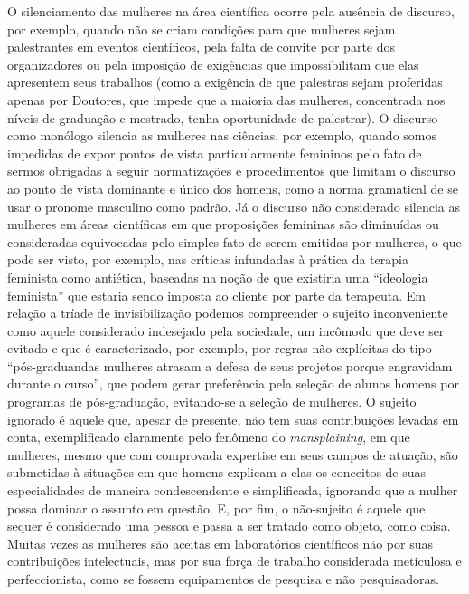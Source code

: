 O silenciamento das mulheres na área científica ocorre pela ausência de discurso, por exemplo, quando não se criam condições para que mulheres sejam palestrantes em eventos científicos, pela falta de convite por parte dos organizadores ou pela imposição de exigências que impossibilitam que elas apresentem seus trabalhos (como a exigência de que palestras sejam proferidas apenas por Doutores, que impede que a maioria das mulheres, concentrada nos níveis de graduação e mestrado, tenha oportunidade de palestrar). O discurso como monólogo silencia as mulheres nas ciências, por exemplo, quando somos impedidas de expor pontos de vista particularmente femininos pelo fato de sermos obrigadas a seguir normatizações e procedimentos que limitam o discurso ao ponto de vista dominante e único dos homens, como a norma gramatical de se usar o pronome masculino como padrão.  Já o discurso não considerado silencia as mulheres em áreas científicas em que proposições femininas são diminuídas ou consideradas equivocadas pelo simples fato de serem emitidas por mulheres, o que pode ser visto, por exemplo, nas críticas infundadas à prática da terapia feminista como antiética, baseadas na noção de que existiria uma “ideologia feminista” que estaria sendo imposta ao cliente por parte da terapeuta. Em relação a tríade de invisibilização podemos compreender o sujeito inconveniente como aquele considerado indesejado pela sociedade, um incômodo que deve ser evitado e que é caracterizado, por exemplo, por regras não explícitas do tipo “pós-graduandas mulheres atrasam a defesa de seus projetos porque engravidam durante o curso”, que podem gerar preferência pela seleção de alunos homens por programas de pós-graduação, evitando-se a seleção de mulheres. O sujeito ignorado é aquele que, apesar de presente, não tem suas contribuições levadas em conta, exemplificado claramente pelo fenômeno do \textit{mansplaining}, em que mulheres, mesmo que com comprovada expertise em seus campos de atuação, são submetidas à situações em que homens explicam a elas os conceitos de suas especialidades de maneira condescendente e simplificada, ignorando que a mulher possa dominar o assunto em questão. E, por fim, o não-sujeito é aquele que sequer é considerado uma pessoa e passa a ser tratado como objeto, como coisa. Muitas vezes as mulheres são aceitas em laboratórios científicos não por suas contribuições intelectuais, mas por sua força de trabalho considerada meticulosa e perfeccionista, como se fossem equipamentos de pesquisa e não pesquisadoras.

